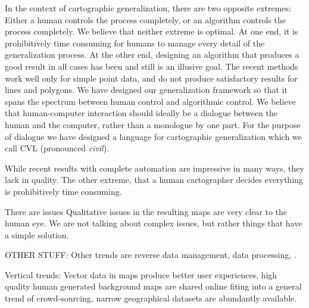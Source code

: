 In the context of cartographic generalization, there are two opposite extremes: Either a human controls the process completely, or an algorithm controls the process completely. We believe that neither extreme is optimal. At one end, it is prohibitively time consuming for humans to manage every detail of the generalization process. At the other end, designing an algorithm that produces a good result in all cases has been and still is an illusive goal. The recent methods work well only for simple point data, and do not produce satisfactory results for lines and polygons. We have designed our generalization framework so that it spans the spectrum between human control and algorithmic control. We believe that human-computer interaction should ideally be a dialogue between the human and the computer, rather than a monologue by one part. For the purpose of dialogue we have designed a language for cartographic generalization which we call CVL (pronounced \emph{civil}).

While recent results with complete automation are impressive in many ways, they lack in quality. The other extreme, that a human cartographer decides everything is prohibitively time consuming.


 There are issues Qualitative issues in the resulting maps are very clear to the human eye. We are not talking about complex issues, but rather things that have a simple solution.

OTHER STUFF: Other trends are reverse data management, data processing, .

Vertical trends: Vector data in maps \cite{apple,googlemaps} produce better user experiences, high quality human generated background maps are shared online \cite{openstreetmap,googlemaps,tilemill}  fiting into a general trend of crowd-sourcing, narrow geographical datasets are abundantly available.
